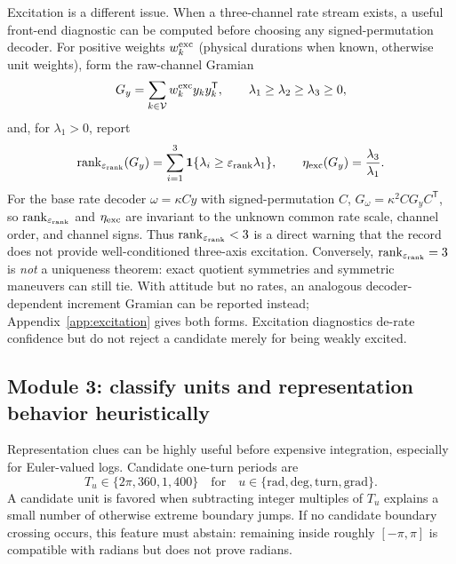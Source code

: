 \documentclass[11pt]{article}
\begin{document}
    Excitation is a different issue. When a three-channel rate stream exists, a useful
    front-end diagnostic can be computed before choosing any signed-permutation decoder.
    For positive weights $w_k^{\rm exc}$ (physical durations when known, otherwise unit
    weights), form the raw-channel Gramian
    \begin{equation}
        G_y=\sum_{k\in\mathcal V}w_k^{\rm exc}y_k y_k^{\mathsf T},
        \qquad
        \lambda_1\ge\lambda_2\ge\lambda_3\ge0,
        \label{eq:focused-excitation-gramian}
    \end{equation}
    and, for $\lambda_1>0$, report
    \begin{equation}
        \operatorname{rank}_{\varepsilon_{\rm rank}}(G_y)
        =\sum_{i=1}^{3}\mathbf 1\{\lambda_i\ge\varepsilon_{\rm rank}\lambda_1\},
        \qquad
        \eta_{\rm exc}(G_y)=\frac{\lambda_3}{\lambda_1}.
        \label{eq:focused-excitation}
    \end{equation}
    For the base rate decoder $\omega=\kappa Cy$ with signed-permutation $C$,
    $G_\omega=\kappa^2 C G_y C^{\mathsf T}$, so $\operatorname{rank}_{\varepsilon_{\rm rank}}$ and $\eta_{\rm exc}$ are invariant
    to the unknown common rate scale, channel order, and channel signs. Thus
    $\operatorname{rank}_{\varepsilon_{\rm rank}}<3$ is a direct warning that the record does not provide well-conditioned
    three-axis excitation. Conversely, $\operatorname{rank}_{\varepsilon_{\rm rank}}=3$ is \emph{not} a uniqueness
    theorem: exact quotient symmetries and symmetric maneuvers can still tie. With attitude
    but no rates, an analogous decoder-dependent increment Gramian can be reported instead;
    Appendix~\ref{app:excitation} gives both forms. Excitation diagnostics de-rate confidence
    but do not reject a candidate merely for being weakly excited.

    \subsection{Module 3: classify units and representation behavior heuristically}

    Representation clues can be highly useful before expensive integration, especially for
    Euler-valued logs. Candidate one-turn periods are
    \begin{equation}
        T_u\in\{2\pi,360,1,400\}
        \quad\text{for}\quad
        u\in\{\mathrm{rad},\mathrm{deg},\mathrm{turn},\mathrm{grad}\}.
        \label{eq:focused-unit-periods}
    \end{equation}
    A candidate unit is favored when subtracting integer multiples of $T_u$ explains a small
    number of otherwise extreme boundary jumps. If no candidate boundary crossing occurs,
    this feature must abstain: remaining inside roughly $[-\pi,\pi]$ is compatible with
    radians but does not prove radians.
\end{document}
